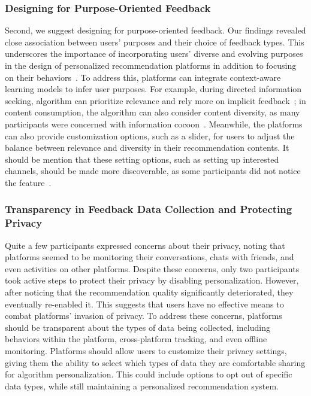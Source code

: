 \subsubsection{Designing for Purpose-Oriented Feedback}
Second, we suggest designing for purpose-oriented feedback. Our findings revealed close association between users' purposes and their choice of feedback types. This underscores the importance of incorporating users' diverse and evolving purposes in the design of personalized recommendation platforms in addition to focusing on their behaviors~\cite{liang2023enabling, nazari2022choice}. To address this, platforms can integrate context-aware learning models to infer user purposes. For example, during directed information seeking, algorithm can prioritize relevance and rely more on implicit feedback~\cite{white2005study}; in content consumption, the algorithm can also consider content diversity, as many participants were concerned with information cocoon~\cite{li2022exploratory}. Meanwhile, the platforms can also provide customization options, such as a slider, for users to adjust the balance between relevance and diversity in their recommendation contents. It should be mention that these setting options, such as setting up interested channels, should be made more discoverable, as some participants did not notice the feature~\cite{liu2024train}.

\subsubsection{Transparency in Feedback Data Collection and Protecting Privacy}
Quite a few participants expressed concerns about their privacy, noting that platforms seemed to be monitoring their conversations, chats with friends, and even activities on other platforms. Despite these concerns, only two participants took active steps to protect their privacy by disabling personalization. However, after noticing that the recommendation quality significantly deteriorated, they eventually re-enabled it. This suggests that users have no effective means to combat platforms' invasion of privacy. To address these concerns, platforms should be transparent about the types of data being collected, including behaviors within the platform, cross-platform tracking, and even offline monitoring. Platforms should allow users to customize their privacy settings, giving them the ability to select which types of data they are comfortable sharing for algorithm personalization. This could include options to opt out of specific data types, while still maintaining a personalized recommendation system.

